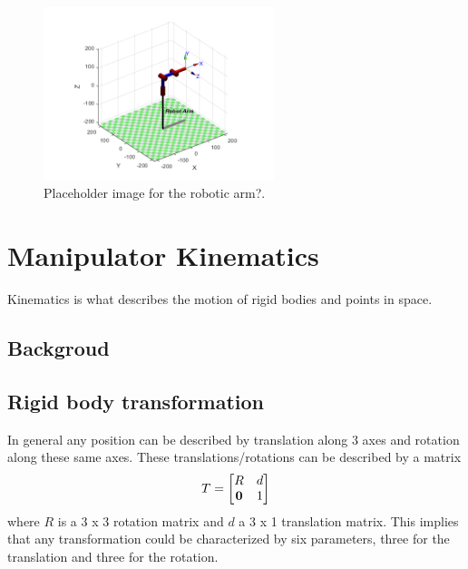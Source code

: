 

\begin{figure}[H]
    \centering
    \includegraphics[width=0.6\textwidth]{chapters/img/robot_arm.png}
    \caption{Placeholder image for the robotic arm?.}
    \label{fig:robotic_manipulator_general}
\end{figure}


\section*{Manipulator Kinematics} %
Kinematics is what describes the motion of rigid bodies and points in space. 

\subsection*{Backgroud}
\subsection*{Rigid body transformation}
In general any position can be described by translation along 3 axes and rotation along these same axes. These translations/rotations can be described by a matrix
\begin{equation}
    T = 
    \begin{bmatrix}
        R & d \\
        \bf{0} & 1
    \end{bmatrix}
\end{equation}
where \(R\) is a 3 x 3 rotation matrix and \(d\) a 3 x 1 translation matrix. This implies that any transformation could be characterized by six parameters, three for the translation and three for the rotation. \cite{spong}


